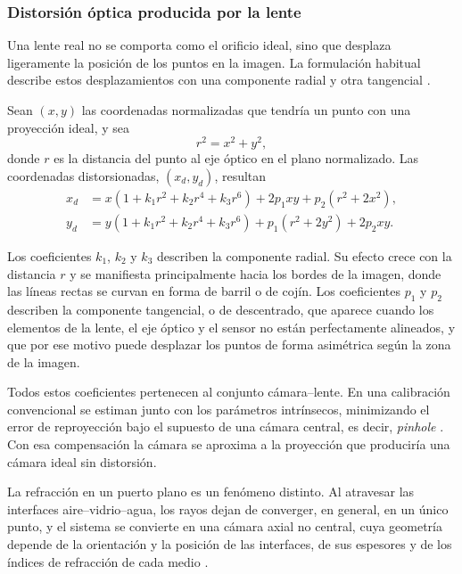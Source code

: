 \subsubsection{Distorsión óptica producida por la lente}

Una lente real no se comporta como el orificio ideal, sino que desplaza ligeramente la posición de los puntos en la imagen. La formulación habitual describe estos desplazamientos con una componente radial y otra tangencial \parencite{Brown1966,Weng1992}.

Sean $(x, y)$ las coordenadas normalizadas que tendría un punto con una proyección ideal, y sea
\begin{equation}
r^2 = x^2 + y^2,
\end{equation}
donde $r$ es la distancia del punto al eje óptico en el plano normalizado. Las coordenadas distorsionadas, $(x_d, y_d)$, resultan
\begin{equation}
\begin{aligned}
x_d &= x\left(1 + k_1 r^2 + k_2 r^4 + k_3 r^6\right) + 2p_1 xy + p_2\left(r^2 + 2x^2\right),\\
y_d &= y\left(1 + k_1 r^2 + k_2 r^4 + k_3 r^6\right) + p_1\left(r^2 + 2y^2\right) + 2p_2 xy.
\end{aligned}
\label{eq:distorsion}
\end{equation}

Los coeficientes $k_1$, $k_2$ y $k_3$ describen la componente radial. Su efecto crece con la distancia $r$ y se manifiesta principalmente hacia los bordes de la imagen, donde las líneas rectas se curvan en forma de barril o de cojín. Los coeficientes $p_1$ y $p_2$ describen la componente tangencial, o de descentrado, que aparece cuando los elementos de la lente, el eje óptico y el sensor no están perfectamente alineados, y que por ese motivo puede desplazar los puntos de forma asimétrica según la zona de la imagen.

Todos estos coeficientes pertenecen al conjunto cámara--lente. En una calibración convencional se estiman junto con los parámetros intrínsecos, minimizando el error de reproyección bajo el supuesto de una cámara central, es decir, \emph{pinhole} \parencite{Zhang2000}. Con esa compensación la cámara se aproxima a la proyección que produciría una cámara ideal sin distorsión.

La refracción en un puerto plano es un fenómeno distinto. Al atravesar las interfaces aire--vidrio--agua, los rayos dejan de converger, en general, en un único punto, y el sistema se convierte en una cámara axial no central, cuya geometría depende de la orientación y la posición de las interfaces, de sus espesores y de los índices de refracción de cada medio \parencite{Agrawal2012,JordtSedlazeck2012}.

